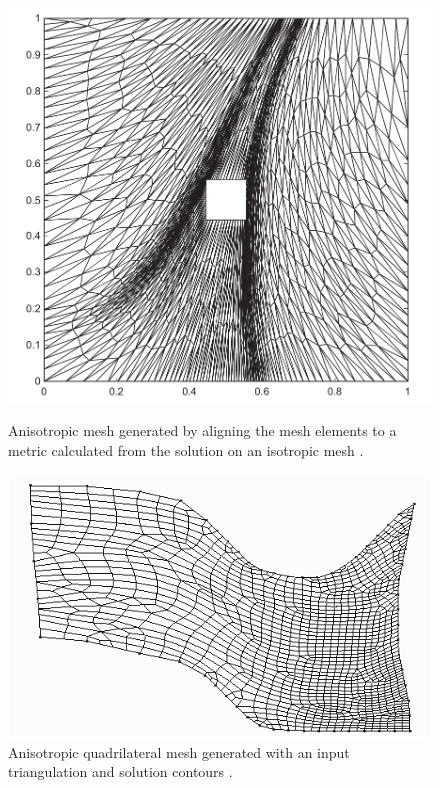 \begin{figure}
\centering
\begin{minipage}[b]{.44\textwidth}
	\includegraphics[width=\linewidth]{img/intro/lit/anisotropicMeshAdaptation.png}
	\caption{Anisotropic mesh generated by aligning the mesh elements to a metric calculated from the solution on an isotropic mesh \cite{li2010anisotropic}.}
	\label{fig-anisotropicMeshAdaptation}
\end{minipage}\hfill
\begin{minipage}[b]{.44\textwidth}
	\includegraphics[width=\linewidth]{img/intro/lit/anisotropicQuadMesh.png}
	\caption{Anisotropic quadrilateral mesh generated with an input triangulation and solution contours \cite{viswanath2000quadrilateral}.}
	\label{fig-anisotropicQuadMesh}
\end{minipage}
\end{figure}


